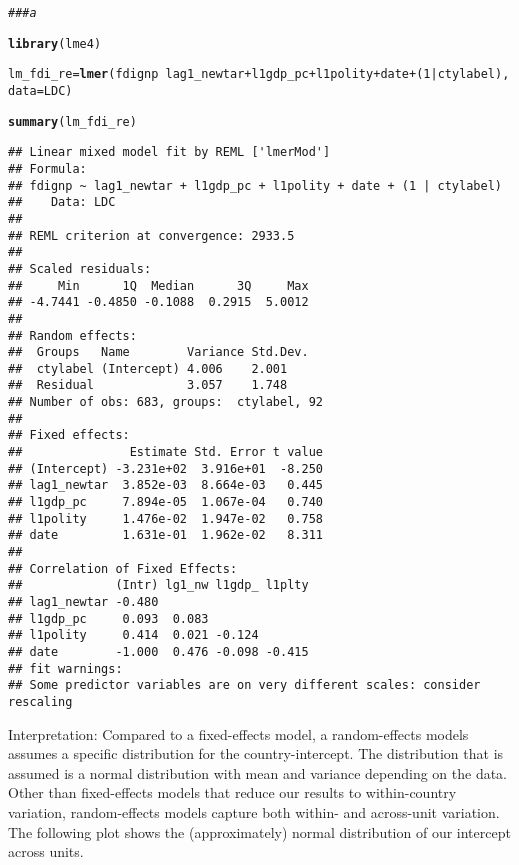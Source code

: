 \documentclass[12pt]{article}\usepackage[]{graphicx}\usepackage[]{color}
\makeatletter
\newcommand{\hlnum}[1]{\textcolor[rgb]{0.686,0.059,0.569}{#1}}%
\newcommand{\hlcom}[1]{\textcolor[rgb]{0.678,0.584,0.686}{\textit{#1}}}%
\newcommand{\hlopt}[1]{\textcolor[rgb]{0,0,0}{#1}}%
\newcommand{\hlstd}[1]{\textcolor[rgb]{0.345,0.345,0.345}{#1}}%
\newcommand{\hlkwb}[1]{\textcolor[rgb]{0.69,0.353,0.396}{#1}}%
\newcommand{\hlkwc}[1]{\textcolor[rgb]{0.333,0.667,0.333}{#1}}%
\newcommand{\hlkwd}[1]{\textcolor[rgb]{0.737,0.353,0.396}{\textbf{#1}}}%
\newenvironment{kframe}{%
 \def\at@end@of@kframe{}%
 \ifinner\ifhmode%
  \def\at@end@of@kframe{\end{minipage}}%
  \begin{minipage}{\columnwidth}%
 \fi\fi%
 \def\FrameCommand##1{\hskip\@totalleftmargin \hskip-\fboxsep
 \colorbox{shadecolor}{##1}\hskip-\fboxsep
     \hskip-\linewidth \hskip-\@totalleftmargin \hskip\columnwidth}%
 \MakeFramed {\advance\hsize-\width
   \@totalleftmargin\z@ \linewidth\hsize
   \@setminipage}}%
 {\par\unskip\endMakeFramed%
 \at@end@of@kframe}
\newenvironment{knitrout}{}{} %
\makeatother
\begin{document}
\begin{knitrout}
\color{fgcolor}\begin{kframe}
\begin{alltt}
\hlcom{### a}

\hlkwd{library}\hlstd{(lme4)}
\end{alltt}


{\ttfamily\noindent\itshape\color{messagecolor}{\#\# Loading required package: Matrix}}\begin{alltt}
\hlstd{lm_fdi_re} \hlkwb{=} \hlkwd{lmer}\hlstd{(fdignp} \hlopt{~} \hlstd{lag1_newtar} \hlopt{+} \hlstd{l1gdp_pc} \hlopt{+} \hlstd{l1polity} \hlopt{+} \hlstd{date} \hlopt{+} \hlstd{(}\hlnum{1} \hlopt{|} \hlstd{ctylabel),}
    \hlkwc{data} \hlstd{= LDC)}
\end{alltt}


{\ttfamily\noindent\color{warningcolor}{\#\# Warning: Some predictor variables are on very different scales: consider rescaling}}\begin{alltt}
\hlkwd{summary}\hlstd{(lm_fdi_re)}
\end{alltt}
\begin{verbatim}
## Linear mixed model fit by REML ['lmerMod']
## Formula: 
## fdignp ~ lag1_newtar + l1gdp_pc + l1polity + date + (1 | ctylabel)
##    Data: LDC
## 
## REML criterion at convergence: 2933.5
## 
## Scaled residuals: 
##     Min      1Q  Median      3Q     Max 
## -4.7441 -0.4850 -0.1088  0.2915  5.0012 
## 
## Random effects:
##  Groups   Name        Variance Std.Dev.
##  ctylabel (Intercept) 4.006    2.001   
##  Residual             3.057    1.748   
## Number of obs: 683, groups:  ctylabel, 92
## 
## Fixed effects:
##               Estimate Std. Error t value
## (Intercept) -3.231e+02  3.916e+01  -8.250
## lag1_newtar  3.852e-03  8.664e-03   0.445
## l1gdp_pc     7.894e-05  1.067e-04   0.740
## l1polity     1.476e-02  1.947e-02   0.758
## date         1.631e-01  1.962e-02   8.311
## 
## Correlation of Fixed Effects:
##             (Intr) lg1_nw l1gdp_ l1plty
## lag1_newtar -0.480                     
## l1gdp_pc     0.093  0.083              
## l1polity     0.414  0.021 -0.124       
## date        -1.000  0.476 -0.098 -0.415
## fit warnings:
## Some predictor variables are on very different scales: consider rescaling
\end{verbatim}
\end{kframe}
\end{knitrout}

Interpretation: Compared to a fixed-effects model, a random-effects models assumes a specific distribution for the country-intercept. The distribution that is assumed is a normal distribution with mean and variance depending on the data. Other than fixed-effects models that reduce our results to within-country variation, random-effects models capture both within- and across-unit variation. The following plot shows the (approximately) normal distribution of our intercept across units.
\end{document}
